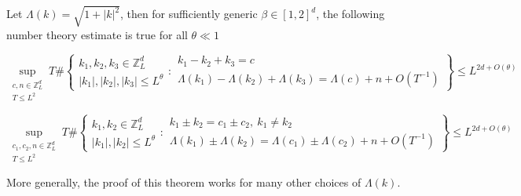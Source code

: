 \begin{thm}\label{th.numbertheory.fourwave}
Let $\Lambda(k)=\sqrt{1+|k|^2}$, then for sufficiently generic $\beta\in [1,2]^d$, the following number theory estimate is true for all $\theta\ll 1$

\begin{equation}\label{eq.numbertheory.fourwave}
    \sup_{\substack{c,n\in\mathbb{Z}_L^d\\T\le L^{2}}}
    T\#\left\{
        \begin{matrix}
            k_1,k_2,k_3\in\mathbb{Z}_L^d \\
            |k_1|,|k_2|,|k_3|\le L^\theta
        \end{matrix}
        :
        \begin{matrix}
            k_1-k_2+k_3=c \\
            \Lambda(k_1)-\Lambda(k_2)+\Lambda(k_3)=\Lambda(c)+n+O(T^{-1})
        \end{matrix}
    \right\}\le L^{2d+O(\theta)}
\end{equation}

\begin{equation}\label{eq.numbertheory'.fourwave}
    \sup_{\substack{c_1,c_2,n\in\mathbb{Z}_L^d\\T\le L^{2}}}
    T\#\left\{
        \begin{matrix}
            k_1,k_2\in\mathbb{Z}_L^d \\
            |k_1|, |k_2|\le L^\theta
        \end{matrix}
        :
        \begin{matrix}
            k_1\pm k_2=c_1\pm c_{2},\ k_1\ne k_2 \\
            \Lambda(k_1)\pm\Lambda(k_2)=\Lambda(c_1)\pm \Lambda(c_2)+n+O(T^{-1})
        \end{matrix}
    \right\}\le L^{2d+O(\theta)}
\end{equation}

More generally, the proof of this theorem works for many other choices of $\Lambda(k)$.
\end{thm}


